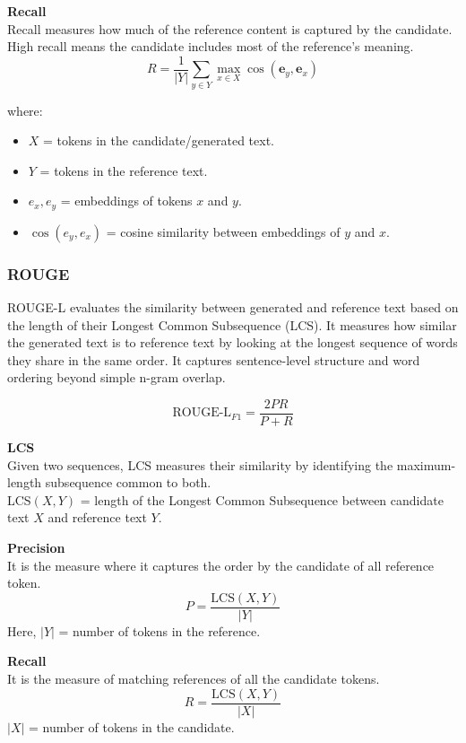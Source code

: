 \textbf{Recall}\\
Recall measures how much of the reference content is captured by the candidate. High recall means the candidate includes most of the reference’s meaning.
\begin{equation}
R = \frac{1}{|Y|} \sum_{y \in Y} \max_{x \in X} \cos(\mathbf{e}_y, \mathbf{e}_x)
\end{equation}

where:

\begin{itemize}
    \item $X$ = tokens in the candidate/generated text.
    \item $Y$ = tokens in the reference text.
    \item $e_x, e_y$ = embeddings of tokens $x$ and $y$.
    \item $\cos(e_y, e_x)$ = cosine similarity between embeddings of $y$ and $x$.
\end{itemize}


\subsubsection{ROUGE}
ROUGE-L evaluates the similarity between generated and reference text based on the length of their Longest Common Subsequence (LCS). It measures how similar the generated text is to reference text by looking at the longest sequence of words they share in the same order. It captures sentence-level structure and word ordering beyond simple n-gram overlap.

\begin{equation}
\text{ROUGE-L}_{F1} =
\frac{2PR}{P + R}
\end{equation}

\textbf{LCS}\\
Given two sequences, LCS measures their similarity by identifying the maximum-length subsequence common to both.\\
LCS$(X, Y)$ = length of the Longest Common Subsequence between candidate text $X$ and reference text $Y$.

\textbf{Precision}\\
It is the measure where it captures the order by the candidate of all reference token.
\begin{equation}
P = \frac{\text{LCS}(X, Y)}{|Y|}
\end{equation}
Here, $|Y|$ = number of tokens in the reference.

\textbf{Recall}\\
It is the measure of matching references of all the candidate tokens.
\begin{equation}
R = \frac{\text{LCS}(X, Y)}{|X|}
\end{equation}
$|X|$ = number of tokens in the candidate.

